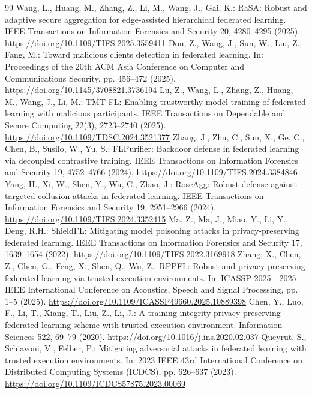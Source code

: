 \documentclass[runningheads,orivec]{llncs}
\begin{document}
\begin{thebibliography}{99}
     Wang, L., Huang, M., Zhang, Z., Li, M., Wang, J., Gai, K.: RaSA: Robust and adaptive secure aggregation for edge-assisted hierarchical federated learning. IEEE Transactions on Information Forensics and Security 20, 4280--4295 (2025). \url{https://doi.org/10.1109/TIFS.2025.3559411}
     Dou, Z., Wang, J., Sun, W., Liu, Z., Fang, M.: Toward malicious clients detection in federated learning. In: Proceedings of the 20th ACM Asia Conference on Computer and Communications Security, pp. 456--472 (2025). \url{https://doi.org/10.1145/3708821.3736194}
     Lu, Z., Wang, L., Zhang, Z., Huang, M., Wang, J., Li, M.: TMT-FL: Enabling trustworthy model training of federated learning with malicious participants. IEEE Transactions on Dependable and Secure Computing 22(3), 2723--2740 (2025). \url{https://doi.org/10.1109/TDSC.2024.3521377}
     Zhang, J., Zhu, C., Sun, X., Ge, C., Chen, B., Susilo, W., Yu, S.: FLPurifier: Backdoor defense in federated learning via decoupled contrastive training. IEEE Transactions on Information Forensics and Security 19, 4752--4766 (2024). \url{https://doi.org/10.1109/TIFS.2024.3384846}
     Yang, H., Xi, W., Shen, Y., Wu, C., Zhao, J.: RoseAgg: Robust defense against targeted collusion attacks in federated learning. IEEE Transactions on Information Forensics and Security 19, 2951--2966 (2024). \url{https://doi.org/10.1109/TIFS.2024.3352415}
     Ma, Z., Ma, J., Miao, Y., Li, Y., Deng, R.H.: ShieldFL: Mitigating model poisoning attacks in privacy-preserving federated learning. IEEE Transactions on Information Forensics and Security 17, 1639--1654 (2022). \url{https://doi.org/10.1109/TIFS.2022.3169918}
     Zhang, X., Chen, Z., Chen, G., Feng, X., Shen, Q., Wu, Z.: RPPFL: Robust and privacy-preserving federated learning via trusted execution environments. In: ICASSP 2025 - 2025 IEEE International Conference on Acoustics, Speech and Signal Processing, pp. 1--5 (2025). \url{https://doi.org/10.1109/ICASSP49660.2025.10889398}
     Chen, Y., Luo, F., Li, T., Xiang, T., Liu, Z., Li, J.: A training-integrity privacy-preserving federated learning scheme with trusted execution environment. Information Sciences 522, 69--79 (2020). \url{https://doi.org/10.1016/j.ins.2020.02.037}
     Queyrut, S., Schiavoni, V., Felber, P.: Mitigating adversarial attacks in federated learning with trusted execution environments. In: 2023 IEEE 43rd International Conference on Distributed Computing Systems (ICDCS), pp. 626--637 (2023). \url{https://doi.org/10.1109/ICDCS57875.2023.00069}

\end{thebibliography}
\end{document}
